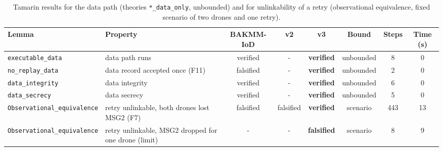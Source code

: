 \begin{table}[!t]
\centering
\footnotesize
\caption{Tamarin results for the data path (theories \texttt{*\_data\_only}, unbounded) and for unlinkability of a retry (observational equivalence, fixed scenario of two drones and one retry).}
\label{tab:tamarin-extra}
\setlength{\tabcolsep}{3pt}
\begin{tabular}{p{3.9cm}p{4.0cm}cccccc}
\toprule
Lemma & Property & BAKMM-IoD & v2 & v3 & Bound & Steps & Time (s) \\
\midrule
\texttt{executable\_\allowbreak{}data} & data path runs & verified & - & \textbf{verified} & unbounded & 8 & 0 \\
\texttt{no\_\allowbreak{}replay\_\allowbreak{}data} & data record accepted once (F11) & falsified & - & \textbf{verified} & unbounded & 2 & 0 \\
\texttt{data\_\allowbreak{}integrity} & data integrity & verified & - & \textbf{verified} & unbounded & 6 & 0 \\
\texttt{data\_\allowbreak{}secrecy} & data secrecy & verified & - & \textbf{verified} & unbounded & 5 & 0 \\
\texttt{Observational\_\allowbreak{}equivalence} & retry unlinkable, both drones lost MSG2 (F7) & falsified & falsified & \textbf{verified} & scenario & 443 & 13 \\
\texttt{Observational\_\allowbreak{}equivalence} & retry unlinkable, MSG2 dropped for one drone (limit) & - & - & \textbf{falsified} & scenario & 8 & 9 \\
\bottomrule
\end{tabular}
\end{table}
